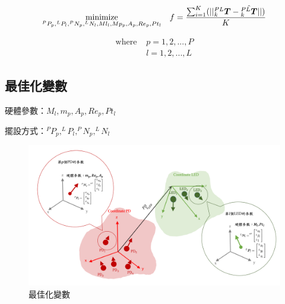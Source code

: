 \begin{equation}
    \label{eqn:objective}
    \underset{^{P}P_p, ^{L}P_l,^{P}N_p, ^{L}N_l,Ml_l,Mp_p,A_p,Re_p,Pt_l}{\operatorname{minimize}} 
    \quad f = 
    \frac{\sum_{i=1}^{K}(||^{PL}_k\boldsymbol{T} -\hat{^{PL}_k\boldsymbol{T} } ||)}{K}  \\
\end{equation}


\begin{align*} \text{where }
    &p=1,2,...,P\\&l=1,2,...,L
\end{align*}



\subsection{最佳化變數}

硬體參數：$M_l,m_p,A_p,Re_p,Pt_l$

擺設方式：$^{P}P_p, ^{L}P_l,^{P}N_p, ^{L}N_l$

\begin{figure}[ht]
    \centering
    \includegraphics[width=12cm]{ch4pic/variable.png}
    \caption{最佳化變數}
    \label{pic:variable}
\end{figure}